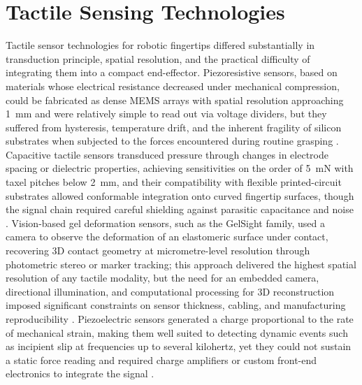 \documentclass[12pt, a4paper]{report}
\begin{document}
\section{Tactile Sensing Technologies}
Tactile sensor technologies for robotic fingertips differed substantially in transduction principle, spatial resolution, and the practical difficulty of integrating them into a compact end-effector. Piezoresistive sensors, based on materials whose electrical resistance decreased under mechanical compression, could be fabricated as dense MEMS arrays with spatial resolution approaching 1~mm and were relatively simple to read out via voltage dividers, but they suffered from hysteresis, temperature drift, and the inherent fragility of silicon substrates when subjected to the forces encountered during routine grasping \cite{dahiya2010}. Capacitive tactile sensors transduced pressure through changes in electrode spacing or dielectric properties, achieving sensitivities on the order of 5~mN with taxel pitches below 2~mm, and their compatibility with flexible printed-circuit substrates allowed conformable integration onto curved fingertip surfaces, though the signal chain required careful shielding against parasitic capacitance and noise \cite{dahiya2010}. Vision-based gel deformation sensors, such as the GelSight family, used a camera to observe the deformation of an elastomeric surface under contact, recovering 3D contact geometry at micrometre-level resolution through photometric stereo or marker tracking; this approach delivered the highest spatial resolution of any tactile modality, but the need for an embedded camera, directional illumination, and computational processing for 3D reconstruction imposed significant constraints on sensor thickness, cabling, and manufacturing reproducibility \cite{donggelsight2021}. %
Piezoelectric sensors generated a charge proportional to the rate of mechanical strain, making them well suited to detecting dynamic events such as incipient slip at frequencies up to several kilohertz, yet they could not sustain a static force reading and required charge amplifiers or custom front-end electronics to integrate the signal \cite{dahiya2010}.
\end{document}
